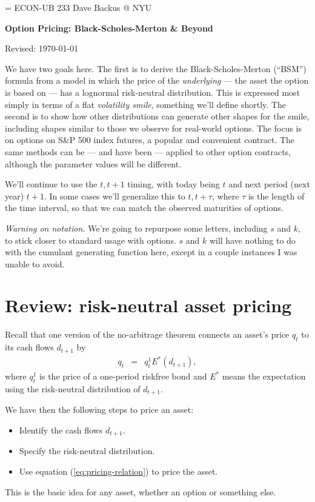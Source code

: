 \documentclass[11pt]{article}
\begin{document}
\parskip=\bigskipamount
\parindent=0.0in
\thispagestyle{empty}
{\large ECON-UB 233 \hfill Dave Backus @ NYU}

\bigskip\bigskip
\centerline{\Large \bf Option Pricing: Black-Scholes-Merton \& Beyond}
\centerline{Revised: \today}

\bigskip
We have two goals here.
The first is to derive the Black-Scholes-Merton (``BSM'') formula from a model
in which the price of the {\it underlying\/} ---
the asset the option is based on ---
has a lognormal risk-neutral distribution.
This is expressed most simply in terms of a flat {\it volatility smile\/},
something we'll define shortly.
The second is to show how other distributions can generate other
shapes for the smile, including shapes similar to those
we observe for real-world options.
The focus is on options on S\&P 500 index futures,
a popular and convenient contract.
The same methods can be --- and have been ---
applied to other option contracts,
although the parameter values will be different.


We'll continue to use the $t, t+1$ timing,
with today being $t$ and next period (next year) $t+1$.
In some cases we'll generalize this to $t,t+\tau$,
where $\tau$ is the length of the time interval,
so that we can match the observed maturities of options.

{\it Warning on notation.\/}
We're going to repurpose some letters, including $s$ and $k$,
to stick closer to standard usage with options.
$s$ and $k$ will have nothing to do with the cumulant generating function here,
except in a couple instances I was unable to avoid.

\section{Review:  risk-neutral asset pricing}

Recall that one version of the no-arbitrage theorem connects an asset's price $q_t$
to its cash flows $d_{t+1}$ by
\begin{eqnarray}
    q_t &=& q^1_t E^* \left( d_{t+1} \right) ,
    \label{eq:pricing-relation}
\end{eqnarray}
where $q^1_t$ is the price of a one-period riskfree bond
and $E^*$ means the expectation using the risk-neutral distribution
of $d_{t+1}$.

We have then the following steps to price an asset:
\begin{itemize}
\item Identify the cash flows $d_{t+1}$.
\item Specify the risk-neutral distribution.
\item Use equation (\ref{eq:pricing-relation}) to price the asset.
\end{itemize}
This is the basic idea for any asset,
whether an option or something else.
\end{document}
